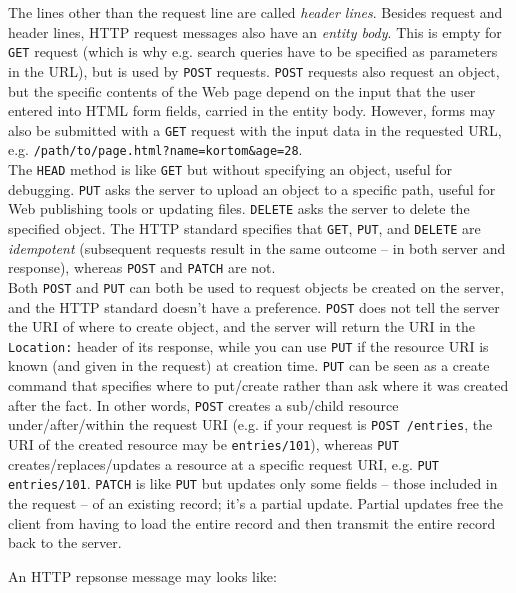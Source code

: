 \documentclass[8pt, table, xcdraw]{article}%
\begin{document}
The lines other than the request line are called \emph{header lines}. Besides request and header lines, HTTP request messages also have an \emph{entity body}. This is empty for \lstinline{GET} request (which is why e.g. search queries have to be specified as parameters in the URL), but is used by \lstinline{POST} requests. \lstinline{POST} requests also request an object, but the specific contents of the Web page depend on the input that the user entered into HTML form fields, carried in the entity body. However, forms may also be submitted with a \lstinline{GET} request with the input data in the requested URL, e.g. \lstinline{/path/to/page.html?name=kortom&age=28}.\\
The \lstinline{HEAD} method is like \lstinline{GET} but without specifying an object, useful for debugging. \lstinline{PUT} asks the server to upload an object to a specific path, useful for Web publishing tools or updating files. \lstinline{DELETE} asks the server to delete the specified object. The HTTP standard specifies that \lstinline{GET}, \lstinline{PUT}, and \lstinline{DELETE} are \emph{idempotent} (subsequent requests result in the same outcome -- in both server and response), whereas \lstinline{POST} and \lstinline{PATCH} are not.\\
Both \lstinline{POST} and \lstinline{PUT} can both be used to request objects be created on the server, and the HTTP standard doesn't have a preference. \lstinline{POST} does not tell the server the URI of where to create object, and the server will return the URI in the \lstinline{Location:} header of its response, while you can use \lstinline{PUT} if the resource URI is known (and given in the request) at creation time. \lstinline{PUT} can be seen as a create command that specifies where to put/create rather than ask where it was created after the fact. In other words, \lstinline{POST} creates a sub/child resource under/after/within the request URI (e.g. if your request is \lstinline{POST /entries}, the URI of the created resource may be \lstinline{entries/101}), whereas \lstinline{PUT} creates/replaces/updates a resource at a specific request URI, e.g. \lstinline{PUT entries/101}. \lstinline{PATCH} is like \lstinline{PUT} but updates only some fields -- those included in the request -- of an existing record; it's a partial update. Partial updates free the client from having to load the entire record and then transmit the entire record back to the server.

An HTTP repsonse message may looks like:
\end{document}
